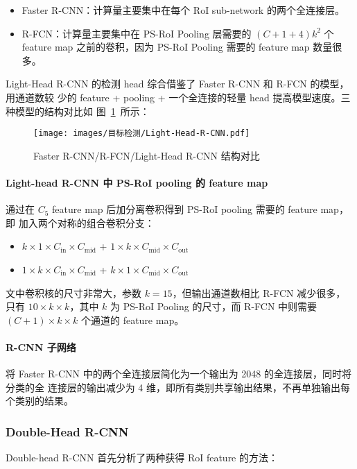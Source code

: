 \begin{itemize}
  \item Faster R-CNN：计算量主要集中在每个 RoI sub-network 的两个全连接层。
  \item R-FCN：计算量主要集中在 PS-RoI Pooling 层需要的 $(C+1+4)k^2$ 个 feature
    map 之前的卷积，因为 PS-RoI Pooling 需要的 feature map 数量很多。
\end{itemize}

Light-Head R-CNN 的检测 head 综合借鉴了 Faster R-CNN 和 R-FCN 的模型，用通道数较
少的 feature + pooling + 一个全连接的轻量 head 提高模型速度。三种模型的结构对比如
图~\ref{fig:light-head}~所示：

\begin{figure}[ht]
  \centering
  \texttt{[image: images/目标检测/Light-Head-R-CNN.pdf]}
  \caption{Faster R-CNN/R-FCN/Light-Head R-CNN 结构对比}
  \label{fig:light-head}
\end{figure}

\paragraph{Light-head R-CNN 中 PS-RoI pooling 的 feature map}
通过在 $C_5$ feature map 后加分离卷积得到 PS-RoI pooling 需要的 feature map，即
加入两个对称的组合卷积分支：

\begin{itemize}
  \item $k \times 1 \times C_{\mathrm{in}} \times C_{\mathrm{mid}}$ + $1 \times k
    \times C_{\mathrm{mid}} \times C_{\mathrm{out}}$
  \item $1 \times k \times C_{\mathrm{in}} \times C_{\mathrm{mid}}$ + $k \times 1
    \times C_{\mathrm{mid}} \times C_{\mathrm{out}}$
\end{itemize}

文中卷积核的尺寸非常大，参数 $k=15$，但输出通道数相比 R-FCN 减少很多，只有 $10
\times k \times k$，其中 $k$ 为 PS-RoI Pooling 的尺寸，而 R-FCN 中则需要 $(C+1)
\times k \times k$ 个通道的 feature map。

\paragraph{R-CNN 子网络}
将 Faster R-CNN 中的两个全连接层简化为一个输出为 2048 的全连接层，同时将分类的全
连接层的输出减少为 4 维，即所有类别共享输出结果，不再单独输出每个类别的结果。

\subsubsection{Double-Head R-CNN}
Double-head R-CNN 首先分析了两种获得 RoI feature 的方法：

